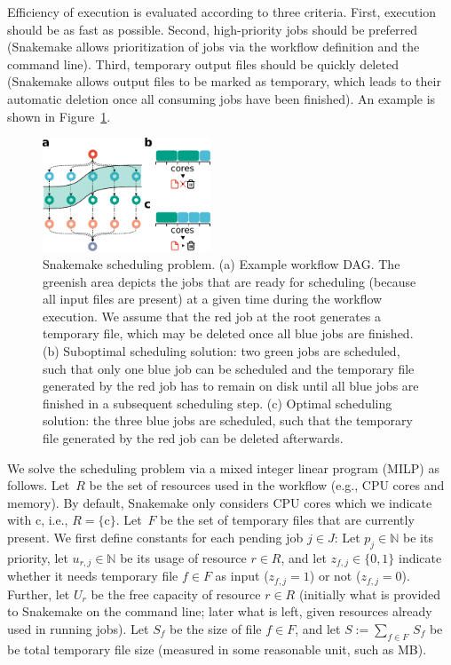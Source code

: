 \documentclass[10pt,a4paper,twocolumn]{article}
\begin{document}
Efficiency of execution is evaluated according to three criteria.
First, execution should be as fast as possible.
Second, high-priority jobs should be preferred (Snakemake allows prioritization of jobs via the workflow definition and the command line).
Third, temporary output files should be quickly deleted (Snakemake allows output files to be marked as temporary, which leads to their automatic deletion once all consuming jobs have been finished).
An example is shown in Figure~\ref{fig:scheduling}.

\begin{figure}\centering
\includegraphics[width=5cm]{scheduling.pdf}
\caption{
Snakemake scheduling problem. 
(a) Example workflow DAG.
The greenish area depicts the jobs that are ready for scheduling (because all input files are present) at a given time during the workflow execution.
We assume that the red job at the root generates a temporary file, which may be deleted once all blue jobs are finished.
(b) Suboptimal scheduling solution: two green jobs are scheduled, such that only one blue job can be scheduled and the temporary file generated by the red job has to remain on disk until all blue jobs are finished in a subsequent scheduling step. 
(c) Optimal scheduling solution: the three blue jobs are scheduled, such that the temporary file generated by the red job can be deleted afterwards.}
\label{fig:scheduling}
\end{figure}

\newcommand{\N}{\mathbb{N}}
\newcommand{\cores}{\text{c}}
\newcommand{\fueralle}{\text{ for all }}
\newcommand{\question}[1]{\textbf{({#1})}}

We solve the scheduling problem via a mixed integer linear program (MILP) as follows.
Let~$R$ be the set of resources used in the workflow (e.g., CPU cores and memory).
By default, Snakemake only considers CPU cores which we indicate with $\cores$, i.e., $R = \{\cores\}$.
Let~$F$ be the set of temporary files that are currently present.
We first define constants for each pending job $j \in J$: 
Let $p_j \in \N$ be its priority, let $u_{r,j} \in \N$ be its usage of resource $r \in R$, and let $z_{f,j} \in \{0,1\}$ indicate whether it needs temporary file $f \in F$ as input ($z_{f,j}=1$) or not ($z_{f,j}=0$).
Further, let $U_r$ be the free capacity of resource $r \in R$ (initially what is provided to Snakemake on the command line; later what is left, given resources already used in running jobs).
Let $S_f$ be the size of file $f \in F$, and let $S := \sum_{f\in F}\, S_f$ be be total temporary file size (measured in some reasonable unit, such as MB).
\end{document}
